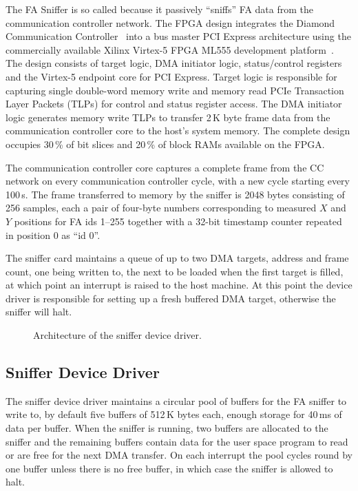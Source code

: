 \documentclass{JAC2003}
\begin{document}
The FA Sniffer is so called because it passively ``sniffs'' FA data from the
communication controller network.  The FPGA design integrates the Diamond
Communication Controller~\cite{cc} into a bus master PCI Express architecture
using the commercially available Xilinx Virtex-5 FPGA ML555 development
platform~\cite{fpga-kit}.  The design consists of target logic, DMA initiator
logic, status/control registers and the Virtex-5 endpoint core for PCI Express.
Target logic is responsible for capturing single double-word memory write and
memory read PCIe Transaction Layer Packets (TLPs) for control and status
register access.  The DMA initiator logic generates memory write TLPs to
transfer 2\,K byte frame data from the communication controller core to the
host's system memory.  The complete design occupies 30\,\% of bit slices and
20\,\% of block RAMs available on the FPGA.

The communication controller core captures a complete frame from the CC network
on every communication controller cycle, with a new cycle starting every
100\,\textmu s.  The frame transferred to memory by the sniffer is 2048 bytes
consisting of 256 samples, each a pair of four-byte numbers corresponding to
measured $X$ and $Y$ positions for FA ids 1--255 together with a 32-bit
timestamp counter repeated in position 0 as ``id 0''.

The sniffer card maintains a queue of up to two DMA targets, address and frame
count, one being written to, the next to be loaded when the first target is
filled, at which point an interrupt is raised to the host machine.  At this
point the device driver is responsible for setting up a fresh buffered DMA
target, otherwise the sniffer will halt.


\begin{figure}[ht]
\centering

\caption{Architecture of the sniffer device driver.}
\label{driver}
\end{figure}

\subsection{Sniffer Device Driver}

The sniffer device driver maintains a circular pool of buffers for the FA
sniffer to write to, by default five buffers of 512\,K bytes each, enough
storage for 40\,ms of data per buffer.  When the sniffer is running, two buffers
are allocated to the sniffer and the remaining buffers contain data for the
user space program to read or are free for the next DMA transfer.  On each
interrupt the pool cycles round by one buffer unless there is no free buffer, in
which case the sniffer is allowed to halt.
\end{document}
